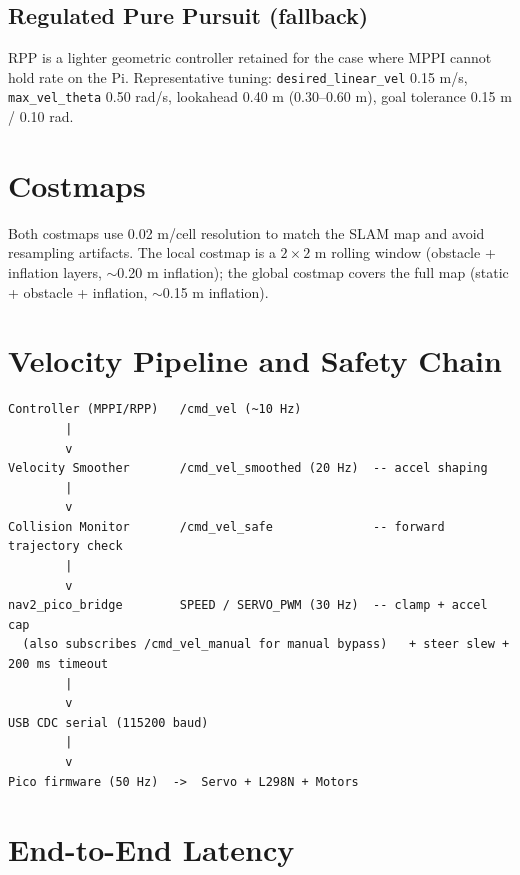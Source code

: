 \documentclass[12pt,a4paper]{report}
\begin{document}
\subsection{Regulated Pure Pursuit (fallback)}

RPP is a lighter geometric controller retained for the case where MPPI cannot
hold rate on the Pi. Representative tuning: \texttt{desired\_linear\_vel}
0.15 m/s, \texttt{max\_vel\_theta} 0.50 rad/s, lookahead 0.40 m (0.30--0.60 m),
goal tolerance 0.15 m / 0.10 rad.

\section{Costmaps}

Both costmaps use 0.02 m/cell resolution to match the SLAM map and avoid
resampling artifacts. The local costmap is a $2\times2$ m rolling window
(obstacle + inflation layers, $\sim$0.20 m inflation); the global costmap covers
the full map (static + obstacle + inflation, $\sim$0.15 m inflation).

\section{Velocity Pipeline and Safety Chain}

\begin{lstlisting}
Controller (MPPI/RPP)   /cmd_vel (~10 Hz)
        |
        v
Velocity Smoother       /cmd_vel_smoothed (20 Hz)  -- accel shaping
        |
        v
Collision Monitor       /cmd_vel_safe              -- forward trajectory check
        |
        v
nav2_pico_bridge        SPEED / SERVO_PWM (30 Hz)  -- clamp + accel cap
  (also subscribes /cmd_vel_manual for manual bypass)   + steer slew + 200 ms timeout
        |
        v
USB CDC serial (115200 baud)
        |
        v
Pico firmware (50 Hz)  ->  Servo + L298N + Motors
\end{lstlisting}

\section{End-to-End Latency}
\end{document}
